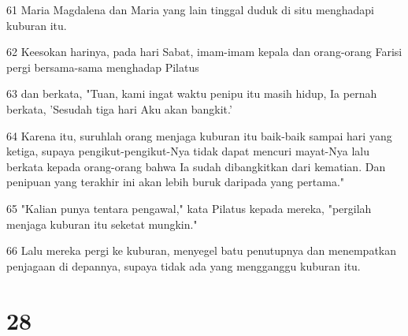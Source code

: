 \par 61 Maria Magdalena dan Maria yang lain tinggal duduk di situ menghadapi kuburan itu.
\par 62 Keesokan harinya, pada hari Sabat, imam-imam kepala dan orang-orang Farisi pergi bersama-sama menghadap Pilatus
\par 63 dan berkata, "Tuan, kami ingat waktu penipu itu masih hidup, Ia pernah berkata, 'Sesudah tiga hari Aku akan bangkit.'
\par 64 Karena itu, suruhlah orang menjaga kuburan itu baik-baik sampai hari yang ketiga, supaya pengikut-pengikut-Nya tidak dapat mencuri mayat-Nya lalu berkata kepada orang-orang bahwa Ia sudah dibangkitkan dari kematian. Dan penipuan yang terakhir ini akan lebih buruk daripada yang pertama."
\par 65 "Kalian punya tentara pengawal," kata Pilatus kepada mereka, "pergilah menjaga kuburan itu seketat mungkin."
\par 66 Lalu mereka pergi ke kuburan, menyegel batu penutupnya dan menempatkan penjagaan di depannya, supaya tidak ada yang mengganggu kuburan itu.

\chapter{28}

